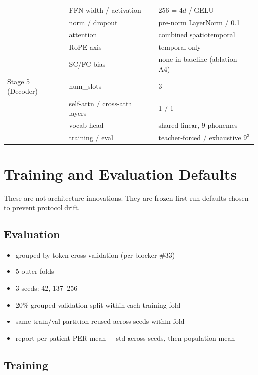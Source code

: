 \documentclass[11pt,letterpaper]{article}
\begin{document}
\begin{center}
\begin{tabular}{@{}p{3.4cm} p{4.0cm} p{7.6cm}@{}}
                 & FFN width / activation & 256 = $4d$ / GELU \\
                 & norm / dropout   & pre-norm LayerNorm / 0.1 \\
                 & attention        & combined spatiotemporal \\
                 & RoPE axis        & temporal only \\
                 & SC/FC bias       & none in baseline (ablation A4) \\
\midrule
Stage 5 (Decoder) & num\_slots      & 3 \\
                 & self-attn / cross-attn layers & 1 / 1 \\
                 & vocab head       & shared linear, 9 phonemes \\
                 & training / eval  & teacher-forced / exhaustive $9^3$ \\
\bottomrule
\end{tabular}
\end{center}


\section{Training and Evaluation Defaults}

These are not architecture innovations. They are frozen first-run defaults chosen to prevent protocol drift.

\subsection{Evaluation}

\begin{itemize}[leftmargin=2em, itemsep=0.2em]
\item grouped-by-token cross-validation (per blocker \#33)
\item 5 outer folds
\item 3 seeds: 42, 137, 256
\item 20\% grouped validation split within each training fold
\item same train/val partition reused across seeds within fold
\item report per-patient PER mean $\pm$ std across seeds, then population mean
\end{itemize}

\subsection{Training}
\end{document}
